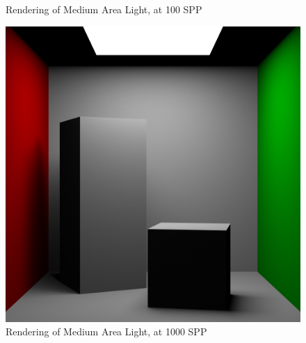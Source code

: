 \documentclass[a4paper]{myarticle}
\begin{document}
\begin{figure}[H]
\begin{minipage}[t]{.3\textwidth}
      \caption{Rendering of Medium Area Light, at 100 SPP}
  \end{minipage}
  \hfill
  \begin{minipage}[t]{.3\textwidth}
      \centering
      \includegraphics[width=\textwidth]{q3/med_2_1000.png}
      \caption{Rendering of Medium Area Light, at 1000 SPP}
  \end{minipage}
\end{figure}
\end{document}

